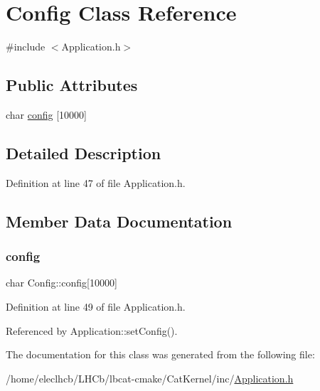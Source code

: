 \hypertarget{classConfig}{}\section{Config Class Reference}
\label{classConfig}


{\ttfamily \#include $<$Application.\+h$>$}

\subsection*{Public Attributes}
\begin{DoxyCompactItemize}
\item 
char \hyperlink{classConfig_a4f977190294b342f444cacd04f0e909b}{config} \mbox{[}10000\mbox{]}
\end{DoxyCompactItemize}


\subsection{Detailed Description}


Definition at line 47 of file Application.\+h.



\subsection{Member Data Documentation}
\mbox{\label{classConfig_a4f977190294b342f444cacd04f0e909b}} 
\subsubsection{\texorpdfstring{config}{config}}
{\footnotesize\ttfamily char Config\+::config\mbox{[}10000\mbox{]}}



Definition at line 49 of file Application.\+h.



Referenced by Application\+::set\+Config().



The documentation for this class was generated from the following file\+:\begin{DoxyCompactItemize}
\item 
/home/eleclhcb/\+L\+H\+Cb/lbcat-\/cmake/\+Cat\+Kernel/inc/\hyperlink{Application_8h}{Application.\+h}\end{DoxyCompactItemize}

